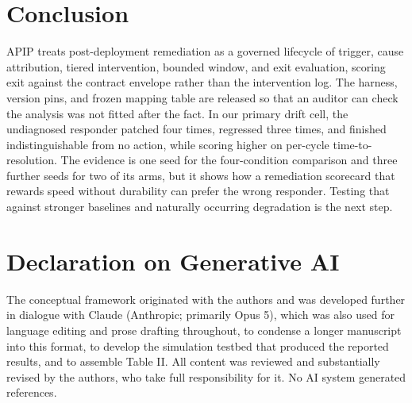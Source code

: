 \documentclass[conference]{IEEEtran}
\begin{document}
\section{Conclusion}

APIP treats post-deployment remediation as a governed lifecycle of trigger, cause attribution, tiered intervention, bounded window, and exit evaluation, scoring exit against the contract envelope rather than the intervention log. The harness, version pins, and frozen mapping table are released so that an auditor can check the analysis was not fitted after the fact. In our primary drift cell, the undiagnosed responder patched four times, regressed three times, and finished indistinguishable from no action, while scoring higher on per-cycle time-to-resolution. The evidence is one seed for the four-condition comparison and three further seeds for two of its arms, but it shows how a remediation scorecard that rewards speed without durability can prefer the wrong responder. Testing that against stronger baselines and naturally occurring degradation is the next step.

\section*{Declaration on Generative AI}

The conceptual framework originated with the authors and was developed further in dialogue with Claude (Anthropic; primarily Opus 5), which was also used for language editing and prose drafting throughout, to condense a longer manuscript into this format, to develop the simulation testbed that produced the reported results, and to assemble Table II. All content was reviewed and substantially revised by the authors, who take full responsibility for it. No AI system generated references.
\end{document}
